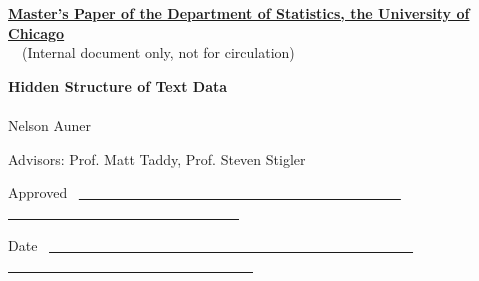 \documentclass[12pt]{article}
\begin{document}
\noindent
\thispagestyle{empty}
\underline{\bf Master's Paper of the Department of Statistics, the
  University of Chicago} 
\\~~(Internal document only, not for circulation) 

\vspace{1.8in}
\begin{center}
{\bf\LARGE Hidden Structure of Text Data }
\\~\\


\vspace{1.4in}
{\Large Nelson Auner}

\vspace{1.3in}
{\Large Advisors: Prof. Matt Taddy, Prof. Steven Stigler \\{\small }}

\end{center}

\vspace{.6in}
{\Large Approved} ~\underline{~~~~~~~~~~~~~~~~~~~~~~~~~~~~~~~~~~~~~~~~~~~~~~
~~~~~~~~~~~~~~~~~~~~~~~~~~~~~~~~~}

\vspace{.2in}
{\Large Date} ~\underline{~~~~~~~~~~~~~~~~~~~~~~~~~~~~~~~~~~~~~~~~~~~~~~~~~~~~
~~~~~~~~~~~~~~~~~~~~~~~~~~~~~~~~~~~}


\newpage
\pagestyle{plain}
\setcounter{page}{1}

\begin{abstract}

\vspace{7mm}\noindent 

This paper introduces a variant to existing models of multinomial
regression for text analysis. Using the base model introduced by Taddy
(2013), we extend the data-generating model to incorporate topics not
explained by existing Metadata. In doing so, we seek to both increase
the prediction accuracy over existing techniques, bridge the gap between
multinomial regression and standard topic models, and investigate
methods for discovering new topics in a corpus. We explore computational
aspects of our approach, provide software for parallelization of the
algorithm, and conclude by proposing areas of future research.

\end{abstract}

\vspace{1.5in}
\tableofcontents


\newpage
\end{document}
